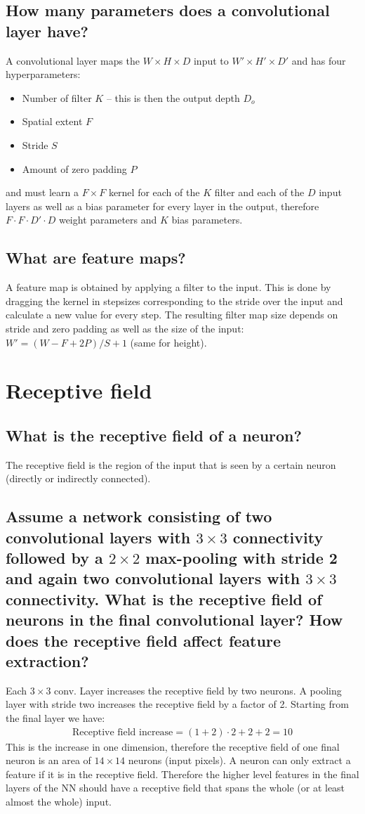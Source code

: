 \subsection{How many parameters does a convolutional layer have?}
A convolutional layer maps the $W \times H \times D$ input to $W' \times H' \times D'$ and has four hyperparameters:
\begin{itemize}
\item Number of filter $K$ -- this is then the output depth $D_o$
\item Spatial extent $F$
\item Stride $S$
\item Amount of zero padding $P$
\end{itemize}
and must learn a $F\times F$ kernel for each of the $K$ filter and each of the $D$ input layers as well as a bias parameter for every layer in the output, therefore $F\cdot  F\cdot  D' \cdot  D$ weight parameters and $K$ bias parameters. 
\subsection{What are feature maps?}
A feature map is obtained by applying a filter to the input. This is done by dragging the kernel in stepsizes corresponding to the stride over the input and calculate a new value for every step. The resulting filter map size depends on stride and zero padding as well as the size of the input: $W' = (W-F+2P)/S +1$ (same for height).
%
\section{Receptive field}
\subsection{What is the receptive field of a neuron?}
The receptive field is the region of the input that is seen by a certain neuron (directly or indirectly connected).
\subsection{Assume a network consisting of two convolutional layers with $3 \times 3$ connectivity followed by a $2 \times 2$ max-pooling with stride 2 and again two convolutional layers with $3 \times 3$ connectivity. What is the receptive field of neurons in the final convolutional layer? How does the receptive field affect feature extraction? }
Each $3\times 3$ conv. Layer increases the receptive field by two neurons. A pooling layer with stride two increases the receptive field by a factor of 2. Starting from the final layer we have:
\begin{align*}
\text{Receptive field increase} = (1+2) \cdot 2 + 2+ 2 = 10
\end{align*}
This is the increase in one dimension, therefore the receptive field of one final neuron is an area of $14\times 14$ neurons (input pixels).
A neuron can only extract a feature if it is in the receptive field. Therefore the higher level features in the final layers of the NN should have a receptive field that spans the whole (or at least almost the whole) input.
